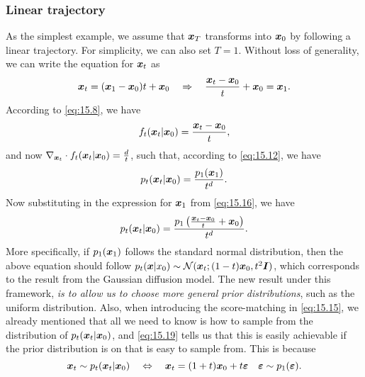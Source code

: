 \subsubsection{Linear trajectory}
As the simplest example, we assume that $\bm{x}_T$ transforms into $\bm{x}_0$ by following a linear trajectory. For simplicity, we can also set $T=1$. Without  loss of generality, we can write the equation for $\bm{x}_{t}$ as 
\begin{equation}
    \bm{x}_{t}=(\bm{x}_1-\bm{x}_0)t+\bm{x}_0\quad\Rightarrow\quad \frac{\bm{x}_{t}-\bm{x}_0}{t}+\bm{x}_0=\bm{x}_1.\label{eq:15.16}
\end{equation}
According to \cref{eq:15.8}, we have
\begin{equation}
    \label{eq:15.17}
    f_t(\bm{x}_{t}|\bm{x}_0)=\frac{\bm{x}_{t}-\bm{x}_0}{t},
\end{equation}
and now $\nabla_{\bm{x}_{t}} \cdot f_t(\bm{x}_{t}|\bm{x}_0)=\frac{d}{t}$, such that, according to \cref{eq:15.12}, we have
\begin{equation}
    \label{15.18}
    p_t(\bm{x}_{t}|\bm{x}_0)=\frac{p_1(\bm{x}_1)}{t^d}.
\end{equation}
Now substituting in the expression for $\bm{x}_1$ from \cref{eq:15.16}, we have
\begin{equation}
    \label{eq:15.19}
    p_t(\bm{x}_{t}|\bm{x}_0)=\frac{p_1\left(\frac{\bm{x}_{t}-\bm{x}_0}{t}+\bm{x}_0\right)}{t^d}.
\end{equation}
More specifically, if $p_1(\bm{x}_1)$ follows the standard normal distribution, then the above equation should follow $p_t(\bm{x}|x_0)\sim\mathcal{N}(\bm{x}_{t};(1-t)\bm{x}_0,t^2\bm{I})$, which corresponds to the result from the Gaussian diffusion model. The new result under this framework, \textit{is to allow us to choose more general prior distributions}, such as the uniform distribution. Also, when introducing the score-matching in \cref{eq:15.15}, we already mentioned that all we need to know is how to sample from the distribution of $p_t(\bm{x}_{t}|\bm{x}_0)$, and \cref{eq:15.19} tells us that this is easily achievable if the prior distribution is on that is easy to sample from. This is because 
\begin{equation}
    \label{eq:15.20}
    \bm{x}_{t}\sim p_{t}(\bm{x}_{t}|\bm{x}_0) \quad\Leftrightarrow\quad \bm{x}_{t}=(1+t)\bm{x}_0+t\bm{\varepsilon}\quad \bm{\varepsilon}\sim p_1(\bm{\varepsilon}).
\end{equation}

